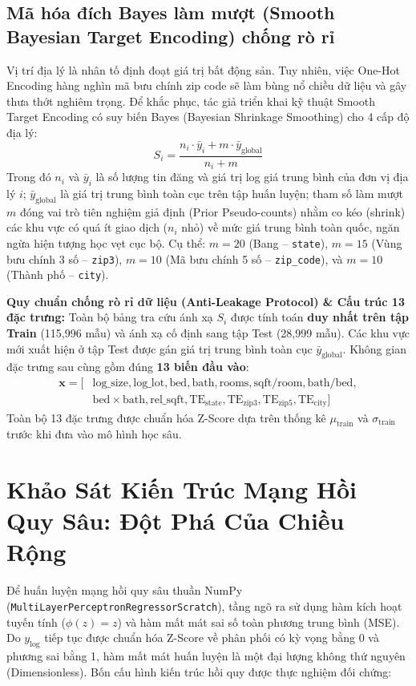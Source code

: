 \documentclass[12pt,a4paper]{report}
\begin{document}
\subsection[Mã hóa đích Bayes làm mượt chống rò rỉ]{Mã hóa đích Bayes làm mượt (Smooth Bayesian Target Encoding) chống rò rỉ}
Vị trí địa lý là nhân tố định đoạt giá trị bất động sản. Tuy nhiên, việc One-Hot Encoding hàng nghìn mã bưu chính zip code sẽ làm bùng nổ chiều dữ liệu và gây thưa thớt nghiêm trọng. Để khắc phục, tác giả triển khai kỹ thuật Smooth Target Encoding có suy biến Bayes (Bayesian Shrinkage Smoothing) cho 4 cấp độ địa lý:
\begin{equation}
    S_i = \frac{n_i \cdot \bar{y}_i + m \cdot \bar{y}_{\text{global}}}{n_i + m}
\end{equation}
Trong đó $n_i$ và $\bar{y}_i$ là số lượng tin đăng và giá trị log giá trung bình của đơn vị địa lý $i$; $\bar{y}_{\text{global}}$ là giá trị trung bình toàn cục trên tập huấn luyện; tham số làm mượt $m$ đóng vai trò tiên nghiệm giả định (Prior Pseudo-counts) nhằm co kéo (shrink) các khu vực có quá ít giao dịch ($n_i$ nhỏ) về mức giá trung bình toàn quốc, ngăn ngừa hiện tượng học vẹt cục bộ. Cụ thể: $m = 20$ (Bang -- \texttt{state}), $m = 15$ (Vùng bưu chính 3 số -- \texttt{zip3}), $m = 10$ (Mã bưu chính 5 số -- \texttt{zip\_code}), và $m = 10$ (Thành phố -- \texttt{city}).

\textbf{Quy chuẩn chống rò rỉ dữ liệu (Anti-Leakage Protocol) \& Cấu trúc 13 đặc trưng:}
Toàn bộ bảng tra cứu ánh xạ $S_i$ được tính toán \textbf{duy nhất trên tập Train} (115,996 mẫu) và ánh xạ cố định sang tập Test (28,999 mẫu). Các khu vực mới xuất hiện ở tập Test được gán giá trị trung bình toàn cục $\bar{y}_{\text{global}}$. Không gian đặc trưng sau cùng gồm đúng \textbf{13 biến đầu vào}:
\begin{equation}
\begin{split}
    \mathbf{x} = \big[ & \text{log\_size}, \text{log\_lot}, \text{bed}, \text{bath}, \text{rooms}, \text{sqft/room}, \text{bath/bed}, \\
    & \text{bed}\times\text{bath}, \text{rel\_sqft}, \text{TE}_{\text{state}}, \text{TE}_{\text{zip3}}, \text{TE}_{\text{zip5}}, \text{TE}_{\text{city}} \big]
\end{split}
\end{equation}
Toàn bộ 13 đặc trưng được chuẩn hóa Z-Score dựa trên thống kê $\mu_{\text{train}}$ và $\sigma_{\text{train}}$ trước khi đưa vào mô hình học sâu.

\section{Khảo Sát Kiến Trúc Mạng Hồi Quy Sâu: Đột Phá Của Chiều Rộng}
Để huấn luyện mạng hồi quy sâu thuần NumPy (\texttt{MultiLayerPerceptronRegressorScratch}), tầng ngõ ra sử dụng hàm kích hoạt tuyến tính ($\phi(z) = z$) và hàm mất mát sai số toàn phương trung bình (MSE). Do $y_{\text{log}}$ tiếp tục được chuẩn hóa Z-Score về phân phối có kỳ vọng bằng 0 và phương sai bằng 1, hàm mất mát huấn luyện là một đại lượng không thứ nguyên (Dimensionless). Bốn cấu hình kiến trúc hồi quy được thực nghiệm đối chứng:
\end{document}
